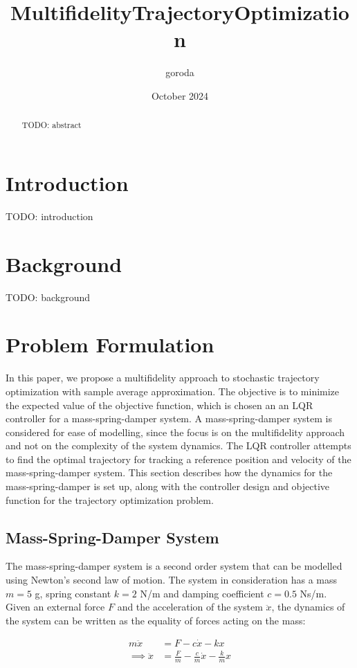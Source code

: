 \documentclass{article}
\title{MultifidelityTrajectoryOptimization}
\author{goroda }
\date{October 2024}
\begin{document}
\maketitle

\begin{abstract}
  TODO: abstract
\end{abstract}

\section{Introduction}
TODO: introduction
\section{Background}
TODO: background

\section{Problem Formulation}
In this paper, we propose a multifidelity approach to stochastic trajectory optimization with sample average approximation.
The objective is to minimize the expected value of the objective function, which is chosen an an LQR controller for a mass-spring-damper system.
A mass-spring-damper system is considered for ease of modelling, since the focus is on the multifidelity approach
and not on the complexity of the system dynamics.
The LQR controller attempts to find the optimal trajectory for tracking a reference position and velocity of the mass-spring-damper system.
This section describes how the dynamics for the mass-spring-damper is set up, along with the controller design and objective function for the trajectory optimization problem.

\subsection{Mass-Spring-Damper System}
The mass-spring-damper system is a second order system that can be modelled using Newton's second law of motion.
The system in consideration has a mass $m=5$ g, spring constant $k=2$ N/m and damping coefficient $c=0.5$ Ns/m.
Given an external force $F$ and the acceleration of the system $\ddot{x}$,
the dynamics of the system can be written as the equality of forces acting on the mass:

$$
\begin{aligned}
  m\ddot{x} &= F - c\dot{x} - kx \\
  \implies \ddot{x} &= \frac{F}{m} - \frac{c}{m}\dot{x} - \frac{k}{m}x
\end{aligned}
$$
\end{document}
